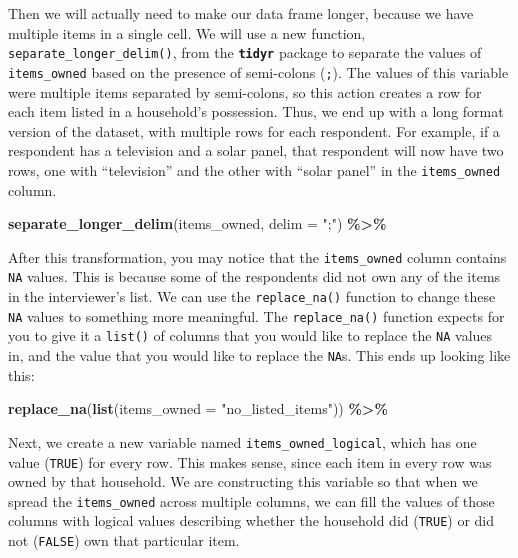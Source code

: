 \documentclass[
]{article}
\newenvironment{Shaded}{\begin{snugshade}}{\end{snugshade}}
\newcommand{\AttributeTok}[1]{\textcolor[rgb]{0.13,0.29,0.53}{#1}}
\newcommand{\FunctionTok}[1]{\textcolor[rgb]{0.13,0.29,0.53}{\textbf{#1}}}
\newcommand{\NormalTok}[1]{#1}
\newcommand{\SpecialCharTok}[1]{\textcolor[rgb]{0.81,0.36,0.00}{\textbf{#1}}}
\newcommand{\StringTok}[1]{\textcolor[rgb]{0.31,0.60,0.02}{#1}}
\begin{document}
Then we will actually need to make our data frame longer, because we
have multiple items in a single cell. We will use a new function,
\texttt{separate\_longer\_delim()}, from the \textbf{\texttt{tidyr}}
package to separate the values of \texttt{items\_owned} based on the
presence of semi-colons (\texttt{;}). The values of this variable were
multiple items separated by semi-colons, so this action creates a row
for each item listed in a household's possession. Thus, we end up with a
long format version of the dataset, with multiple rows for each
respondent. For example, if a respondent has a television and a solar
panel, that respondent will now have two rows, one with ``television''
and the other with ``solar panel'' in the \texttt{items\_owned} column.

\begin{Shaded}
\begin{Highlighting}[]
\FunctionTok{separate\_longer\_delim}\NormalTok{(items\_owned, }\AttributeTok{delim =} \StringTok{";"}\NormalTok{) }\SpecialCharTok{\%\textgreater{}\%}
\end{Highlighting}
\end{Shaded}

After this transformation, you may notice that the \texttt{items\_owned}
column contains \texttt{NA} values. This is because some of the
respondents did not own any of the items in the interviewer's list. We
can use the \texttt{replace\_na()} function to change these \texttt{NA}
values to something more meaningful. The \texttt{replace\_na()} function
expects for you to give it a \texttt{list()} of columns that you would
like to replace the \texttt{NA} values in, and the value that you would
like to replace the \texttt{NA}s. This ends up looking like this:

\begin{Shaded}
\begin{Highlighting}[]
\FunctionTok{replace\_na}\NormalTok{(}\FunctionTok{list}\NormalTok{(}\AttributeTok{items\_owned =} \StringTok{"no\_listed\_items"}\NormalTok{)) }\SpecialCharTok{\%\textgreater{}\%}
\end{Highlighting}
\end{Shaded}

Next, we create a new variable named \texttt{items\_owned\_logical},
which has one value (\texttt{TRUE}) for every row. This makes sense,
since each item in every row was owned by that household. We are
constructing this variable so that when we spread the
\texttt{items\_owned} across multiple columns, we can fill the values of
those columns with logical values describing whether the household did
(\texttt{TRUE}) or did not (\texttt{FALSE}) own that particular item.
\end{document}
